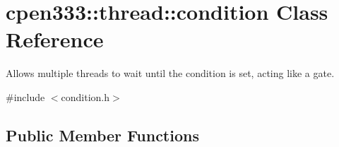 \hypertarget{classcpen333_1_1thread_1_1condition}{}\section{cpen333\+:\+:thread\+:\+:condition Class Reference}
\label{classcpen333_1_1thread_1_1condition}


Allows multiple threads to wait until the condition is set, acting like a gate.  




{\ttfamily \#include $<$condition.\+h$>$}

\subsection*{Public Member Functions}

